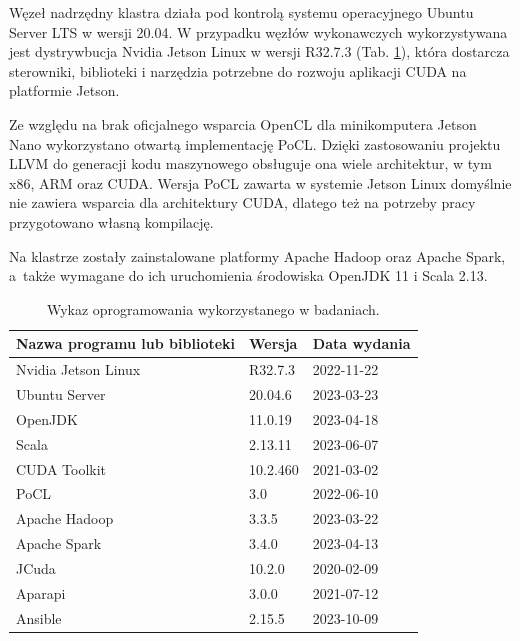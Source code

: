 Węzeł nadrzędny klastra działa pod kontrolą systemu operacyjnego Ubuntu Server LTS w wersji 20.04.
W przypadku węzłów wykonawczych wykorzystywana jest dystrywbucja Nvidia Jetson Linux w wersji
R32.7.3 (Tab. \ref{tab:software}), która dostarcza sterowniki, biblioteki i narzędzia potrzebne do
rozwoju aplikacji CUDA na platformie Jetson.

Ze względu na brak oficjalnego wsparcia OpenCL dla minikomputera Jetson Nano wykorzystano
otwartą implementację PoCL. Dzięki zastosowaniu projektu LLVM do generacji kodu maszynowego
obsługuje ona wiele architektur, w tym x86, ARM oraz CUDA. Wersja PoCL zawarta w systemie
Jetson Linux domyślnie nie zawiera wsparcia dla architektury CUDA, dlatego też na potrzeby
pracy przygotowano własną kompilację.

Na klastrze zostały zainstalowane platformy Apache Hadoop oraz Apache Spark, a~także wymagane do
ich uruchomienia środowiska OpenJDK 11 i Scala 2.13.

\begin{table}[h]
	\centering
	\caption{Wykaz oprogramowania wykorzystanego w badaniach.}
	\begin{tabular}{ | p{7cm} | p{2cm} | p{3cm} | }
		\hline
		Nazwa programu lub biblioteki & Wersja   & Data wydania \\
		\hline
		Nvidia Jetson Linux           & R32.7.3  & 2022-11-22   \\
		Ubuntu Server                 & 20.04.6  & 2023-03-23   \\
		OpenJDK                       & 11.0.19  & 2023-04-18   \\
		Scala                         & 2.13.11  & 2023-06-07   \\
		CUDA Toolkit                  & 10.2.460 & 2021-03-02   \\
		PoCL                          & 3.0      & 2022-06-10   \\
		Apache Hadoop                 & 3.3.5    & 2023-03-22   \\
		Apache Spark                  & 3.4.0    & 2023-04-13   \\
		JCuda                         & 10.2.0   & 2020-02-09   \\
		Aparapi                       & 3.0.0    & 2021-07-12   \\
		Ansible                       & 2.15.5   & 2023-10-09   \\
		\hline
	\end{tabular}
	\label{tab:software}
\end{table}

